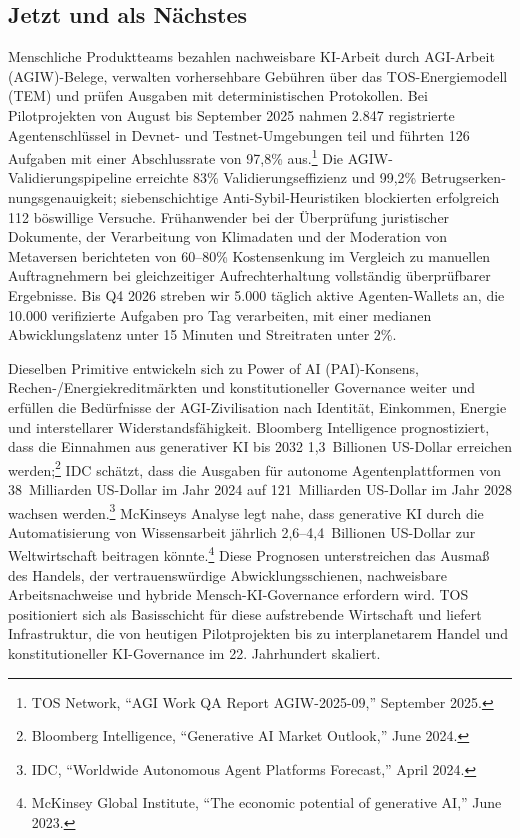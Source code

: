 \documentclass[11pt]{article}
\begin{document}
\subsection{Jetzt und als Nächstes}
\begin{description}[leftmargin=2.1cm, style=nextline]
  \item[12--24 Monate] Menschliche Produktteams bezahlen nachweisbare KI-Arbeit durch AGI-Arbeit (AGIW)-Belege, verwalten vorhersehbare Gebühren über das TOS-Energiemodell (TEM) und prüfen Ausgaben mit deterministischen Protokollen. Bei Pilotprojekten von August bis September 2025 nahmen 2.847 registrierte Agentenschlüssel in Devnet- und Testnet-Umgebungen teil und führten 126 Aufgaben mit einer Abschlussrate von 97,8\% aus.\footnote{TOS Network, ``AGI Work QA Report AGIW-2025-09,'' September 2025.} Die AGIW-Validierungspipeline erreichte 83\% Validierungseffizienz und 99,2\% Betrugserken­nungsgenauigkeit; siebenschichtige Anti-Sybil-Heuristiken blockierten erfolgreich 112 böswillige Versuche. Frühanwender bei der Überprüfung juristischer Dokumente, der Verarbeitung von Klimadaten und der Moderation von Metaversen berichteten von 60--80\% Kostensenkung im Vergleich zu manuellen Auftragnehmern bei gleichzeitiger Aufrechterhaltung vollständig überprüfbarer Ergebnisse. Bis Q4 2026 streben wir 5.000 täglich aktive Agenten-Wallets an, die 10.000 verifizierte Aufgaben pro Tag verarbeiten, mit einer medianen Abwicklungslatenz unter 15 Minuten und Streitraten unter 2\%.

  \item[100-Jahres-Bogen] Dieselben Primitive entwickeln sich zu Power of AI (PAI)-Konsens, Rechen-/Energiekreditmärkten und konstitutioneller Governance weiter und erfüllen die Bedürfnisse der AGI-Zivilisation nach Identität, Einkommen, Energie und interstellarer Widerstandsfähigkeit. Bloomberg Intelligence prognostiziert, dass die Einnahmen aus generativer KI bis 2032 1,3~Billionen US-Dollar erreichen werden;\footnote{Bloomberg Intelligence, ``Generative AI Market Outlook,'' June 2024.} IDC schätzt, dass die Ausgaben für autonome Agentenplattformen von 38~Milliarden US-Dollar im Jahr 2024 auf 121~Milliarden US-Dollar im Jahr 2028 wachsen werden.\footnote{IDC, ``Worldwide Autonomous Agent Platforms Forecast,'' April 2024.} McKinseys Analyse legt nahe, dass generative KI durch die Automatisierung von Wissensarbeit jährlich 2,6--4,4~Billionen US-Dollar zur Weltwirtschaft beitragen könnte.\footnote{McKinsey Global Institute, ``The economic potential of generative AI,'' June 2023.} Diese Prognosen unterstreichen das Ausmaß des Handels, der vertrauenswürdige Abwicklungsschienen, nachweisbare Arbeitsnachweise und hybride Mensch-KI-Governance erfordern wird. TOS positioniert sich als Basisschicht für diese aufstrebende Wirtschaft und liefert Infrastruktur, die von heutigen Pilotprojekten bis zu interplanetarem Handel und konstitutioneller KI-Governance im 22. Jahrhundert skaliert.
\end{description}
\end{document}
